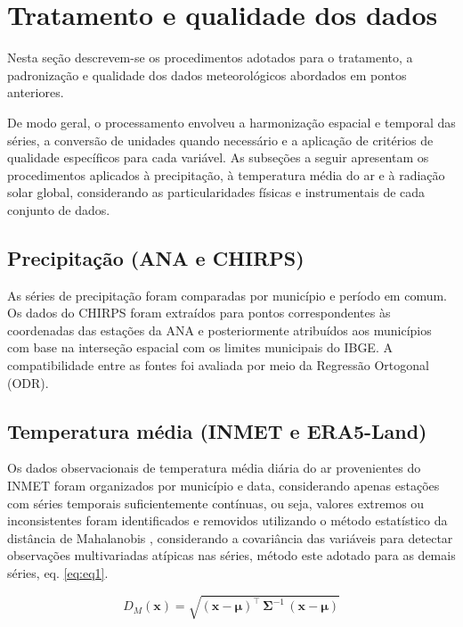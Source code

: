 \section{Tratamento e qualidade dos dados}

Nesta seção descrevem-se os procedimentos adotados para o tratamento, a padronização e qualidade dos dados meteorológicos abordados em pontos anteriores.

De modo geral, o processamento envolveu a harmonização espacial e temporal das séries, a conversão de unidades quando necessário e a aplicação de critérios de qualidade específicos para cada variável. As subseções a seguir apresentam os procedimentos aplicados à precipitação, à temperatura média do ar e à radiação solar global, considerando as particularidades físicas e instrumentais de cada conjunto de dados.

\subsection{Precipitação (ANA e CHIRPS)}

As séries de precipitação foram comparadas por município e período em comum. Os dados do CHIRPS foram extraídos para pontos correspondentes às coordenadas das estações da ANA e posteriormente atribuídos aos municípios com base na interseção espacial com os limites municipais do IBGE. A compatibilidade entre as fontes foi avaliada por meio da Regressão Ortogonal (ODR).

\subsection{Temperatura média (INMET e ERA5-Land)}

Os dados observacionais de temperatura média diária do ar provenientes do INMET foram organizados por município e data, considerando apenas estações com séries temporais suficientemente contínuas, ou seja, valores extremos ou inconsistentes foram identificados e removidos utilizando o método estatístico da distância de Mahalanobis \citep{mahalanobis1936}, considerando a covariância das variáveis para detectar observações multivariadas atípicas nas séries, método este adotado para as demais séries, eq. \ref{eq:eq1}.

\begin{equation}
D_M(\mathbf{x}) = \sqrt{ (\mathbf{x} - \boldsymbol{\mu})^\top \, \mathbf{\Sigma}^{-1} \, (\mathbf{x} - \boldsymbol{\mu}) }
\label{eq:eq1}
\end{equation}

